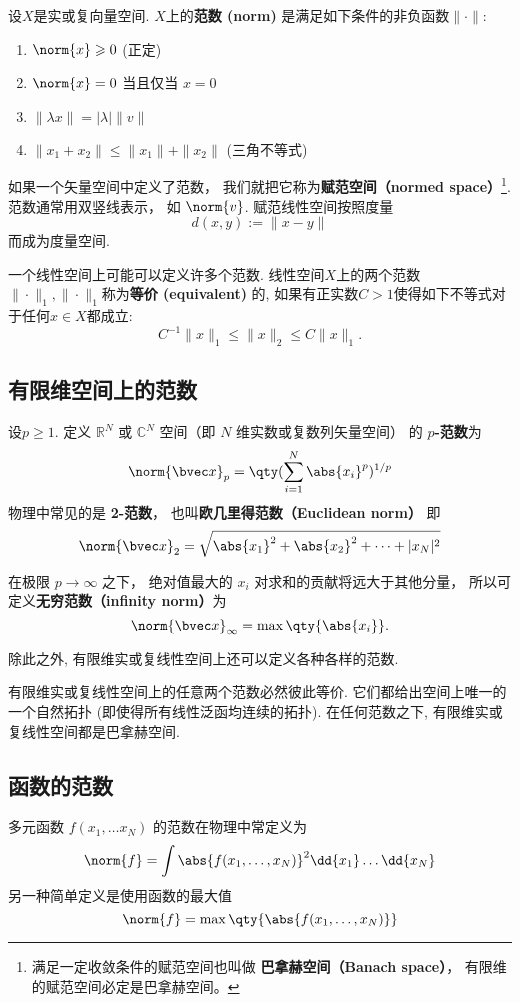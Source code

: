 

设$X$是实或复向量空间. $X$上的\textbf{范数 (norm)} 是满足如下条件的非负函数$\|\cdot\|$:
\begin{enumerate}
\item $\norm{x} \geqslant 0$ (正定)
\item $\norm{x} = 0$ 当且仅当 $x = 0$
\item $\|\lambda x\| = |\lambda|\| v\|$
\item $\|x_1+x_2\| \leqslant \|x_1\|+ \|x_2\|$ (三角不等式)
\end{enumerate}

如果一个矢量空间中定义了范数， 我们就把它称为\textbf{赋范空间（normed space）}\footnote{满足一定收敛条件的赋范空间也叫做 \textbf{巴拿赫空间（Banach space）}， 有限维的赋范空间必定是巴拿赫空间。%
}. 范数通常用双竖线表示， 如 $\norm{v}$. 赋范线性空间按照度量
$$
d(x,y):=\|x-y\|
$$
而成为度量空间. 

一个线性空间上可能可以定义许多个范数. 线性空间$X$上的两个范数$\|\cdot\|_1,\|\cdot\|_1$称为\textbf{等价 (equivalent)} 的, 如果有正实数$C>1$使得如下不等式对于任何$x\in X$都成立:
$$
C^{-1}\|x\|_{1}\leq\|x\|_2\leq C\|x\|_1.
$$

\subsection{有限维空间上的范数}
设$p\geq1$. 定义 $\mathbb R^N$ 或 $\mathbb C^N$ 空间（即 $N$ 维实数或复数列矢量空间） 的 \textbf{$p$-范数}为
\begin{equation}
\norm{\bvec x}_p = \qty(\sum_{i=1}^N \abs{x_i}^p)^{1/p}
\end{equation}
物理中常见的是 \textbf{2-范数}， 也叫\textbf{欧几里得范数（Euclidean norm）} 即
\begin{equation}
\norm{\bvec x}_2 = \sqrt{\abs{x_1}^2 + \abs{x_2}^2 + \dots+|x_N|^2}
\end{equation}

在极限 $p \to \infty$ 之下， 绝对值最大的 $x_i$ 对求和的贡献将远大于其他分量， 所以可定义\textbf{无穷范数（infinity norm）}为
\begin{equation}
\norm{\bvec x}_\infty = \max \qty{\abs{x_i}}.
\end{equation}

除此之外, 有限维实或复线性空间上还可以定义各种各样的范数.

有限维实或复线性空间上的任意两个范数必然彼此等价. 它们都给出空间上唯一的一个自然拓扑 (即使得所有线性泛函均连续的拓扑). 在任何范数之下, 有限维实或复线性空间都是巴拿赫空间.

\subsection{函数的范数}
多元函数 $f(x_1, \dots x_N)$ 的范数在物理中常定义为
\begin{equation}
\norm{f} = \int \abs{f(x_1, \dots, x_N)}^2 \dd{x_1}\dots \dd{x_N}
\end{equation}
另一种简单定义是使用函数的最大值
\begin{equation}
\norm{f} = \max\qty{\abs{f(x_1, \dots, x_N)}}
\end{equation}
